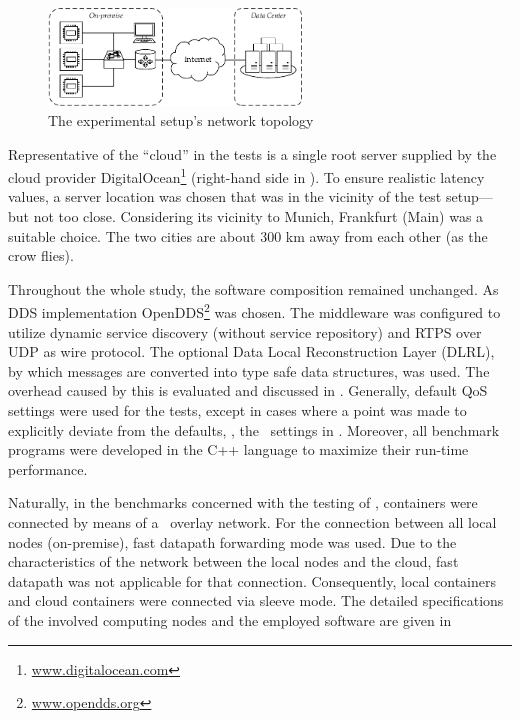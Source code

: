 \begin{figure}[htpb]
  \centering
  \includegraphics[width=0.6\textwidth]{figures/network-setup}
  \caption[Network topology of the experimental setup]{The experimental setup's network topology}\label{fig:network-topology}
\end{figure}
Representative of the ``cloud'' in the tests is a single root server supplied by the cloud provider DigitalOcean\footnote{\url{www.digitalocean.com}} (right-hand side in ). To ensure realistic latency values, a server location was chosen that was in the vicinity of the test setup---but not too close. Considering its vicinity to Munich, Frankfurt (Main) was a suitable choice. The two cities are about 300 km away from each other (as the crow flies).


Throughout the whole study, the software composition remained unchanged. As DDS implementation OpenDDS\footnote{\url{www.opendds.org}} was chosen. The middleware was configured to utilize dynamic service discovery (without service repository) and RTPS over UDP as wire protocol. The optional Data Local Reconstruction Layer (DLRL), by which messages are converted into type safe data structures, was used. The overhead caused by this is evaluated and discussed in . Generally, default QoS settings were used for the tests, except in cases where a point was made to explicitly deviate from the defaults, \eg , the \liveliness\ settings in . Moreover, all benchmark programs were developed in the C++ language to maximize their run-time performance.

Naturally, in the benchmarks concerned with the testing of \wnet , containers were connected by means of a \wnet\ overlay network. For the connection between all local nodes (on-premise), fast datapath forwarding mode was used. Due to the characteristics of the network between the local nodes and the cloud, fast datapath was not applicable for that connection. Consequently, local containers and cloud containers were connected via sleeve mode.
The detailed specifications of the involved computing nodes and the employed software are given in 

